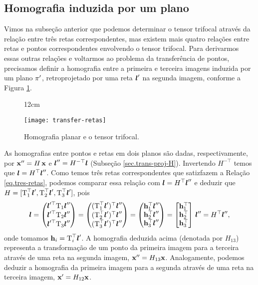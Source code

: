 \subsection{Homografia induzida por um plano}\label{sec.homo-plano-tri}
Vimos na subseção anterior que podemos determinar o tensor trifocal através da relação entre três retas correspondentes, mas existem mais quatro relações entre retas e pontos  correspondentes envolvendo o tensor trifocal. Para derivarmos essas outras relações e voltarmos ao problema da transferência de pontos, precisamos definir a homografia entre a primeira e terceira imagens induzida por um plano $\pi'$, retroprojetado por uma reta $\boldsymbol{l}'$ na segunda imagem, conforme a Figura \ref{fig.transfer-retas}.
\begin{figure}[!htb]{12cm}
\caption{Homografia planar e o tensor trifocal.}
\texttt{[image: transfer-retas]}
\label{fig.transfer-retas}
\end{figure}
As homografias entre pontos e retas em dois planos são dadas, respectivamente, por $\mathbf{x}''=H\,\mathbf{x}$ e $\boldsymbol{l}''=H^{-\top}\boldsymbol{l}$ (Subseção \ref{sec.trans-proj-H}). Invertendo $H^{-\top}$ temos que $\boldsymbol{l}=H^\top\boldsymbol{l}''$. Como temos três retas correspondentes que satizfazem a Relação \ref{eq.tres-retas}, podemos comparar essa relação com $\boldsymbol{l}=H^\top\boldsymbol{l}''$ e deduzir que $H=[\mbox{T}_1^\top\boldsymbol{l}',\mbox{T}_2^\top\boldsymbol{l}',\mbox{T}_3^\top\boldsymbol{l}']$, pois
\begin{equation*}
\boldsymbol{l}=
\begin{pmatrix}
\boldsymbol{l}'^\top \mbox{T}_1\boldsymbol{l}''\\
\boldsymbol{l}'^\top \mbox{T}_2\boldsymbol{l}''\\
\boldsymbol{l}'^\top \mbox{T}_3\boldsymbol{l}''
\end{pmatrix}=
\begin{pmatrix}
(\mbox{T}_1^\top\boldsymbol{l}')^\top\boldsymbol{l}''\\
(\mbox{T}_2^\top\boldsymbol{l}')^\top\boldsymbol{l}''\\
(\mbox{T}_3^\top\boldsymbol{l}')^\top\boldsymbol{l}''
\end{pmatrix}=
\begin{pmatrix}
{\bf h}_1^\top\boldsymbol{l}''\\
{\bf h}_2^\top\boldsymbol{l}''\\
{\bf h}_3^\top\boldsymbol{l}''
\end{pmatrix}=
\begin{bmatrix}
{\bf h}_1^\top\\
{\bf h}_2^\top\\
{\bf h}_3^\top
\end{bmatrix}\,\boldsymbol{l}''=
H^\top\boldsymbol{l}'',
\end{equation*}
onde tomamos ${\bf h}_i=\mbox{T}_i^\top\boldsymbol{l}'$.
A homografia deduzida acima (denotada por $H_{13}$) representa a transformação de um ponto da primeira imagem para a terceira através de uma reta na segunda imagem, $\mathbf{x}''=H_{13}\mathbf{x}$. Analogamente, podemos deduzir a homografia da primeira imagem para a segunda através de uma reta na terceira imagem, $\mathbf{x}'=H_{12}\mathbf{x}$.

